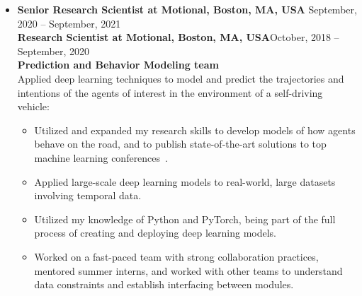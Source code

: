 \documentclass[10pt,letterpaper]{article}
\newcommand{\thing}[2]{{#1} \hfill {#2}}
\begin{document}
\begin{itemize}
\item \thing{\bf Senior Research Scientist at Motional, Boston, MA, USA}{September, 2020 -- September, 2021}\\
 	{\bf Research Scientist at Motional, Boston, MA, USA}\hfill{October, 2018  --  September, 2020}\vspace{0.5em}\\
	{\bf Prediction and Behavior Modeling team}\vspace{0.5em}\\
      	Applied deep learning techniques to model and predict the trajectories and intentions of the agents of interest in the environment of a self-driving vehicle:  %
	\begin{itemize} \itemsep0em
	\vspace{-0.5em}
		\item Utilized and expanded my research skills to develop models of how agents behave on the road, and to publish state-of-the-art solutions to top machine learning conferences~\cite{grigore2020covernet}. 
		\item Applied large-scale deep learning models to real-world, large datasets involving temporal data. 
		\item Utilized my knowledge of Python and PyTorch, being part of the full process of creating and deploying deep learning models. 
		\item Worked on a fast-paced team with strong collaboration practices, mentored summer interns, and worked with other teams to understand data constraints and establish interfacing between modules.
	\end{itemize}
		
	

\end{itemize}
\end{document}
